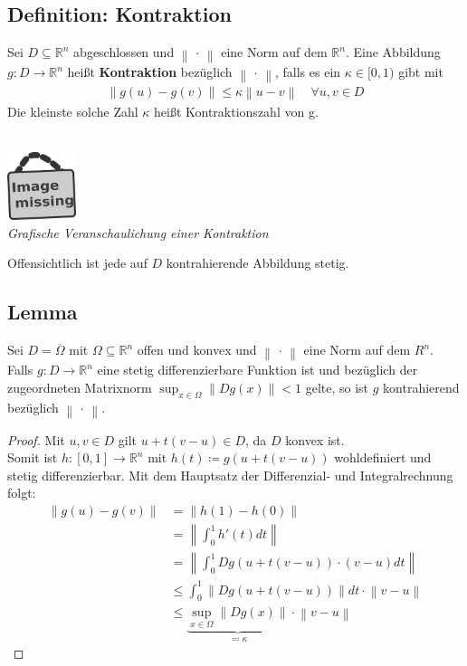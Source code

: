 \documentclass[ngerman,fontsize=11pt, paper=a4, parskip=half, titlepage=true, toc=bib]{scrbook}
\newcommand{\R}{\mathds{R}}
\newcommand{\nn}[1]{\left\| #1 \right\|}
\newcommand{\imagemissing}[1]{
  \begin{center}~\\
    \centering 
    \includegraphics[width=2cm]{images/image_missing.jpg}\\
    \textit{#1} \\
  \end{center}
}
\begin{document}
  \subsection{Definition: Kontraktion} 
  Sei $D\subseteq  \R^n $ abgeschlossen und $\nn{\,\cdot\,}$ eine Norm auf dem $\R^n$.
  Eine Abbildung $g:D\rightarrow \R^n $ heißt \textbf{Kontraktion} bezüglich  $\nn{\,\cdot\,}$,
  falls es ein $\kappa \in [0,1)$ gibt mit
  \begin{gather*}
    \nn{g(u)-g(v)} \leq \kappa \nn{u-v} \quad \forall u,v\in D
  \end{gather*}
  Die kleinste solche Zahl $\kappa$ heißt Kontraktionszahl von g.
  
  \imagemissing{Grafische Veranschaulichung einer Kontraktion}
  
  Offensichtlich ist jede auf $D$ kontrahierende Abbildung stetig.
  
  \subsection{Lemma} \label{5.2.3}
  Sei $D=\overline{\Omega} $ mit $\Omega \subseteq \R^n$ offen und konvex
  und $\nn{\,\cdot\,}$ eine Norm auf dem $R^n$.\\
  Falls $g:D\longrightarrow \R^n$ eine stetig differenzierbare Funktion ist und
  bezüglich der zugeordneten Matrixnorm $\sup_{x\in \Omega}\nn{Dg(x)}<1$ gelte,
  so ist $g$ kontrahierend bezüglich  $\nn{\,\cdot\,}$.
  
  \begin{proof}
    Mit $u,v \in D$ gilt $u+t(v-u)\in D$, da $D$ konvex ist. \\
    Somit ist $h:[0,1]\rightarrow \R^n $ mit $h(t) \coloneqq g(u+t(v-u))$ wohldefiniert
    und stetig differenzierbar. Mit dem Hauptsatz der Differenzial- und Integralrechnung
    folgt:
    \begin{align}\nonumber
      \nn{g(u)-g(v)} & = \nn{h(1)-h(0)}  \\ \nonumber
                     & = \nn{\int_{0}^{1} h'(t) dt} \\ \nonumber
                     & = \nn{\int_{0}^{1} Dg(u+t(v-u))\cdot (v-u)dt} \\ \nonumber
                     & \leq \int_{0}^{1} \nn{Dg(u+t(v-u))}dt \cdot \nn{v-u} \\
                     & \leq \underbrace{\sup_{x\in\Omega}\nn{Dg(x)}}_{\eqqcolon \kappa} 
                       \cdot \nn{v-u}
                       \label{V.2.4}
    \end{align}
  \end{proof}
  
\end{document}
